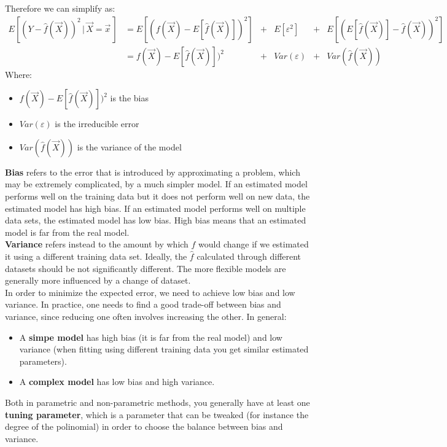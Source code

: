     Therefore we can simplify as:
    \begin{align*}
    E[(Y-\hat{f}(\vec{X}))^2 \,|\, \vec{X} = \vec{x}\,]
    & = E[(f(\vec{X}) - E[\hat{f}(\vec{X})])^2] &+ &E[\varepsilon^2] &+ &E[(E[\hat{f}(\vec{X})] - \hat{f}(\vec{X}))^2] \\
    & = f(\vec{X}) - E[\hat{f}(\vec{X})])^2 &+ &Var(\varepsilon) &+ &Var(\hat{f}(\vec{X})) 
    \end{align*} 
    Where:
    \begin{itemize}
      \item $f(\vec{X}) - E[\hat{f}(\vec{X})])^2$ is the bias
      \item $Var(\varepsilon)$ is the irreducible error
      \item $Var(\hat{f}(\vec{X}))$ is the variance of the model
    \end{itemize}
    \textbf{Bias} refers to the error that is introduced by approximating a problem, which may be extremely complicated, by a much
    simpler model. If an estimated model performs well on the training data but it does not perform well on new data, the estimated model has high bias. If an estimated model performs well on multiple data sets, the estimated model has low bias. High bias means that an estimated model is far from the real model. \\
    \textbf{Variance} refers instead to the amount by which $\hat{f}$ would change if we
    estimated it using a different training data set. Ideally, the $\hat{f}$ calculated 
    through different datasets should be not significantly different. The more flexible models are generally more influenced by a change of dataset. \\
    In order to minimize the expected error, we need to achieve low bias and low variance. In practice, one needs to find a good trade-off between bias and variance, since reducing one often involves increasing the other. In general:
    \begin{itemize}
      \item A \textbf{simpe model} has high bias (it is far from the real model) and low variance (when fitting using different training data you get similar estimated parameters).
      \item A \textbf{complex model} has low bias and high variance.
    \end{itemize}
    Both in parametric and non-parametric methods, you generally have at least one \textbf{tuning parameter}, which is a parameter that can be tweaked (for instance the degree of the polinomial) in order to choose the balance between bias and variance.

